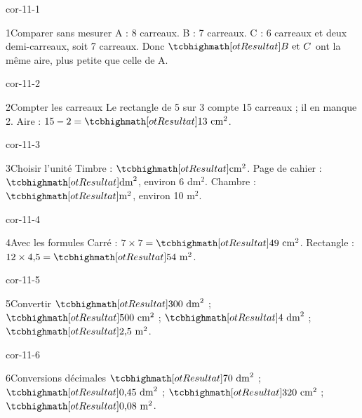 \clearpage\pagestyle{otMain}\setlength{\otBlocEspacement}{2.5mm}\fontsize{11}{15}\selectfont{}
\begin{blocLivre}{cor-11-1}\begin{corrige}{1}{Comparer sans mesurer}
A : 8 carreaux. B : 7 carreaux. C : 6 carreaux et deux demi-carreaux, soit 7 carreaux. Donc $\res{B\text{ et }C}$ ont la même aire, plus petite que celle de A.
\label{fig-cor-11-1}
\end{corrige}\end{blocLivre}
\begin{blocLivre}{cor-11-2}\begin{corrige}{2}{Compter les carreaux}
Le rectangle de 5 sur 3 compte 15 carreaux ; il en manque 2. Aire : $15-2=\res{13\ \mathrm{cm}^2}$.
\label{fig-cor-11-2}
\end{corrige}\end{blocLivre}
\begin{blocLivre}{cor-11-3}\begin{corrige}{3}{Choisir l’unité}
Timbre : $\res{\mathrm{cm}^2}$. Page de cahier : $\res{\mathrm{dm}^2}$, environ 6 dm$^2$. Chambre : $\res{\mathrm m^2}$, environ 10 m$^2$.
\end{corrige}\end{blocLivre}
\begin{blocLivre}{cor-11-4}\begin{corrige}{4}{Avec les formules}
Carré : $7\times7=\res{49\ \mathrm{cm}^2}$. Rectangle : $12\times4{,}5=\res{54\ \mathrm{m}^2}$.
\end{corrige}\end{blocLivre}
\begin{blocLivre}{cor-11-5}\begin{corrige}{5}{Convertir}
$\res{300\ \mathrm{dm}^2}$ ; $\res{500\ \mathrm{cm}^2}$ ; $\res{4\ \mathrm{dm}^2}$ ; $\res{2{,}5\ \mathrm{m}^2}$.
\end{corrige}\end{blocLivre}
\begin{blocLivre}{cor-11-6}\begin{corrige}{6}{Conversions décimales}
$\res{70\ \mathrm{dm}^2}$ ; $\res{0{,}45\ \mathrm{dm}^2}$ ; $\res{320\ \mathrm{cm}^2}$ ; $\res{0{,}08\ \mathrm{m}^2}$.
\end{corrige}\end{blocLivre}
